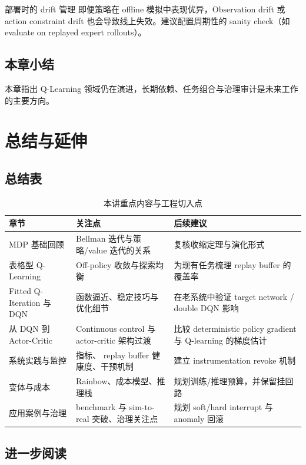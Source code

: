 \documentclass[a4paper]{article}
\begin{document}
\begin{warningbox}{部署时的 drift 管理}
即便策略在 offline 模拟中表现优异，Observation drift 或 action constraint drift 也会导致线上失效。建议配置周期性的 sanity check（如 evaluate on replayed expert rollouts）。
\end{warningbox}

\subsection{本章小结}

本章指出 Q-Learning 领域仍在演进，长期依赖、任务组合与治理审计是未来工作的主要方向。

\section{总结与延伸}

\subsection{总结表}

\begin{table}[H]
\centering
\begin{tabular}{lp{8cm}p{4cm}}
\toprule
章节 & 关注点 & 后续建议 \\
\midrule
MDP 基础回顾 & Bellman 迭代与策略/value 迭代的关系 & 复核收缩定理与演化形式 \\
表格型 Q-Learning & Off-policy 收敛与探索均衡 & 为现有任务梳理 replay buffer 的覆盖率 \\
Fitted Q-Iteration 与 DQN & 函数逼近、稳定技巧与优化细节 & 在老系统中验证 target network / double DQN 影响 \\
从 DQN 到 Actor-Critic & Continuous control 与 actor-critic 架构过渡 & 比较 deterministic policy gradient 与 Q-learning 的梯度估计 \\
系统实践与监控 & 指标、 replay buffer 健康度、干预机制 & 建立 instrumentation revoke 机制 \\
变体与成本 & Rainbow、成本模型、推理栈 & 规划训练/推理预算，并保留挂回路 \\
应用案例与治理 & benchmark 与 sim-to-real 突破、治理关注点 & 规划 soft/hard interrupt 与 anomaly 回滚 \\
\bottomrule
\end{tabular}
\caption{本讲重点内容与工程切入点}
\end{table}

\subsection{进一步阅读}
\end{document}
